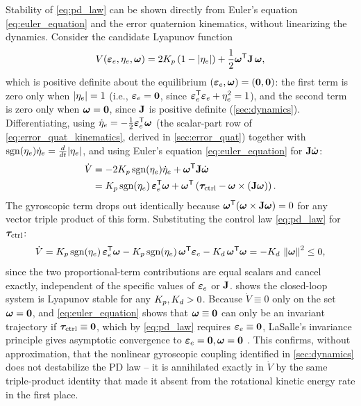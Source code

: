 Stability of \cref{eq:pd_law} can be shown directly from Euler's equation \cref{eq:euler_equation} and the error quaternion kinematics, without linearizing the dynamics. Consider the candidate Lyapunov function
\begin{equation}
    V(\bm{\varepsilon}_e,\eta_e,\bm{\omega}) = 2K_{p}\left(1-|\eta_e|\right) + \frac{1}{2}\bm{\omega}^{\mathsf{T}}\mathbf{J}\,\bm{\omega},
    \label{eq:lyapunov}
\end{equation}
which is positive definite about the equilibrium $(\bm{\varepsilon}_e,\bm{\omega})=(\bm{0},\bm{0})$: the first term is zero only when $|\eta_e|=1$ (i.e., $\bm{\varepsilon}_e=\bm{0}$, since $\bm{\varepsilon}_e^{\mathsf{T}}\bm{\varepsilon}_e+\eta_e^2=1$), and the second term is zero only when $\bm{\omega}=\bm{0}$, since $\mathbf{J}$ is positive definite (\cref{sec:dynamics}). Differentiating, using $\dot{\eta}_e = -\tfrac{1}{2}\bm{\varepsilon}_e^{\mathsf{T}}\bm{\omega}$ (the scalar-part row of \cref{eq:error_quat_kinematics}, derived in \cref{sec:error_quat}) together with $\text{sgn}(\eta_e)\dot{\eta}_e = \frac{d}{dt}|\eta_e|$, and using Euler's equation \cref{eq:euler_equation} for $\mathbf{J}\dot{\bm{\omega}}$:
\begin{align}
    \dot V &= -2K_{p}\,\text{sgn}(\eta_e)\dot{\eta}_e + \bm{\omega}^{\mathsf{T}}\mathbf{J}\dot{\bm{\omega}} \notag\\
    &= K_{p}\,\text{sgn}(\eta_e)\,\bm{\varepsilon}_e^{\mathsf{T}}\bm{\omega} + \bm{\omega}^{\mathsf{T}}\left(\bm{\tau}_{\text{ctrl}} - \bm{\omega}\times(\mathbf{J}\bm{\omega})\right).
    \label{eq:lyapunov_dot_1}
\end{align}
The gyroscopic term drops out identically because $\bm{\omega}^{\mathsf{T}}(\bm{\omega}\times\mathbf{J}\bm{\omega})=0$ for any vector triple product of this form. Substituting the control law \cref{eq:pd_law} for $\bm{\tau}_{\text{ctrl}}$:
\begin{equation}
    \dot V = K_{p}\,\text{sgn}(\eta_e)\,\bm{\varepsilon}_e^{\mathsf{T}}\bm{\omega} - K_{p}\,\text{sgn}(\eta_e)\,\bm{\omega}^{\mathsf{T}}\bm{\varepsilon}_e - K_{d}\,\bm{\omega}^{\mathsf{T}}\bm{\omega} = -K_{d}\,\left\lVert \bm{\omega} \right\rVert^2 \leq 0,
    \label{eq:lyapunov_dot_2}
\end{equation}
since the two proportional-term contributions are equal scalars and cancel exactly, independent of the specific values of $\bm{\varepsilon}_e$ or $\mathbf{J}$.  shows the closed-loop system is Lyapunov stable for any $K_{p},K_{d}>0$. Because $\dot V\equiv0$ only on the set $\bm{\omega}=\bm{0}$, and \cref{eq:euler_equation} shows that $\bm{\omega}\equiv\bm{0}$ can only be an invariant trajectory if $\bm{\tau}_{\text{ctrl}}\equiv\bm{0}$, which by \cref{eq:pd_law} requires $\bm{\varepsilon}_e\equiv\bm{0}$, LaSalle's invariance principle gives asymptotic convergence to $\bm{\varepsilon}_e=\bm{0}, \bm{\omega}=\bm{0}$ \cite{wie1985,wie2008}. This confirms, without approximation, that the nonlinear gyroscopic coupling identified in \cref{sec:dynamics} does not destabilize the PD law -- it is annihilated exactly in $\dot V$ by the same triple-product identity that made it absent from the rotational kinetic energy rate in the first place.

